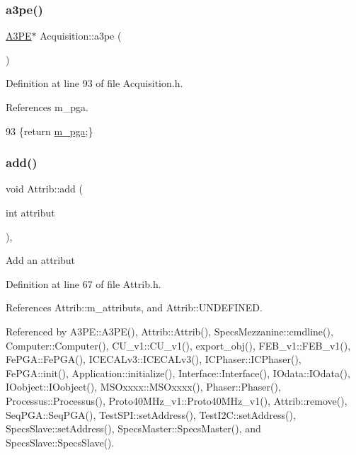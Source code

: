 \subsubsection{\texorpdfstring{a3pe()}{a3pe()}}
{\footnotesize\ttfamily \hyperlink{classA3PE}{A3\+PE}$\ast$ Acquisition\+::a3pe (\begin{DoxyParamCaption}{ }\end{DoxyParamCaption})\hspace{0.3cm}{\ttfamily [inline]}}



Definition at line 93 of file Acquisition.\+h.



References m\+\_\+pga.


\begin{DoxyCode}
93 \{\textcolor{keywordflow}{return} \hyperlink{classAcquisition_aac113fd42c6574cdb4154e9808a21b67}{m\_pga};\}
\end{DoxyCode}
\mbox{\label{classAttrib_a235f773af19c900264a190b00a3b4ad7}} 
\subsubsection{\texorpdfstring{add()}{add()}}
{\footnotesize\ttfamily void Attrib\+::add (\begin{DoxyParamCaption}\item[{int}]{attribut }\end{DoxyParamCaption})\hspace{0.3cm}{\ttfamily [inline]}, {\ttfamily [inherited]}}

Add an attribut 

Definition at line 67 of file Attrib.\+h.



References Attrib\+::m\+\_\+attributs, and Attrib\+::\+U\+N\+D\+E\+F\+I\+N\+ED.



Referenced by A3\+P\+E\+::\+A3\+P\+E(), Attrib\+::\+Attrib(), Specs\+Mezzanine\+::cmdline(), Computer\+::\+Computer(), C\+U\+\_\+v1\+::\+C\+U\+\_\+v1(), export\+\_\+obj(), F\+E\+B\+\_\+v1\+::\+F\+E\+B\+\_\+v1(), Fe\+P\+G\+A\+::\+Fe\+P\+G\+A(), I\+C\+E\+C\+A\+Lv3\+::\+I\+C\+E\+C\+A\+Lv3(), I\+C\+Phaser\+::\+I\+C\+Phaser(), Fe\+P\+G\+A\+::init(), Application\+::initialize(), Interface\+::\+Interface(), I\+Odata\+::\+I\+Odata(), I\+Oobject\+::\+I\+Oobject(), M\+S\+Oxxxx\+::\+M\+S\+Oxxxx(), Phaser\+::\+Phaser(), Processus\+::\+Processus(), Proto40\+M\+Hz\+\_\+v1\+::\+Proto40\+M\+Hz\+\_\+v1(), Attrib\+::remove(), Seq\+P\+G\+A\+::\+Seq\+P\+G\+A(), Test\+S\+P\+I\+::set\+Address(), Test\+I2\+C\+::set\+Address(), Specs\+Slave\+::set\+Address(), Specs\+Master\+::\+Specs\+Master(), and Specs\+Slave\+::\+Specs\+Slave().


